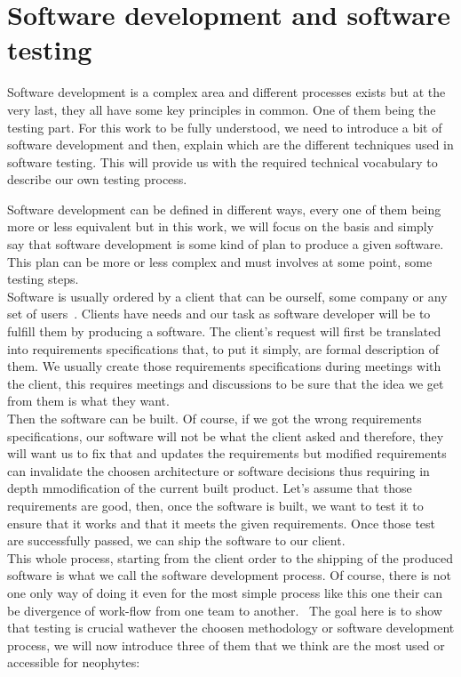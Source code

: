 \documentclass[12pt]{article}
\theoremstyle{definition}
\theoremstyle{definition}
\theoremstyle{remark}
\begin{document}
\clearpage
\part{Software development and software testing}

Software development is a complex area and different processes exists but at the very last, they all have some key principles in common. One of them being the testing part. For this work to be fully understood, we need to introduce a bit of software development and then, explain which are the different techniques used in software testing. This will provide us with the required technical vocabulary to describe our own testing process.

Software development can be defined in different ways, every one of them being more or less equivalent but in this work, we will focus on the basis and simply say that software development is some kind of plan to produce a given software. This plan can be more or less complex and must involves at some point, some testing steps.\\

Software is usually ordered by a client that can be ourself, some company or any set of users~\cite{SoftwareDevelopment:2016}. Clients have needs and our task as software developer will be to fulfill them by producing a software. The client's request will first be translated into requirements specifications that, to put it simply, are formal description of them. We usually create those requirements specifications during meetings with the client, this requires meetings and discussions to be sure that the idea we get from them is what they want.\\

Then the software can be built. Of course, if we got the wrong requirements specifications, our software will not be what the client asked and therefore, they will want us to fix that and updates the requirements but modified requirements can invalidate the choosen architecture or software decisions thus requiring in depth mmodification of the current built product. Let's assume that those requirements are good, then, once the software is built, we want to test it to ensure that it works and that it meets the given requirements. Once those test are successfully passed, we can ship the software to our client.\\

This whole process, starting from the client order to the shipping of the produced software is what we call the software development process. Of course, there is not one only way of doing it even for the most simple process like this one their can be divergence of work-flow from one team to another.~\cite{IIS2:IIS202348} The goal here is to show that testing is crucial wathever the choosen methodology or software development process, we will now introduce three of them that we think are the most used or accessible for neophytes:
\end{document}
